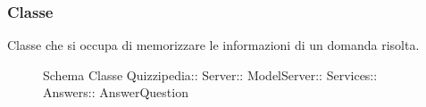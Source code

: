 \subsubsection{Classe }
Classe che si occupa di memorizzare le informazioni di un domanda risolta.
\begin{figure}[H]
\centering
\noindent{}
\caption[Schema Classe AnswerQuestion]{Schema Classe Quizzipedia:: Server:: ModelServer:: Services:: Answers:: AnswerQuestion}
\end{figure}
